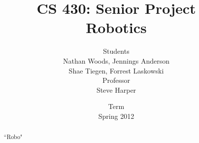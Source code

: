 \begin{titlepage}
\pagestyle{plain}
\lhead{}
\rhead{}
\title{CS 430: Senior Project\\Robotics}
\author{\small{Students}\\
Nathan Woods,  Jennings Anderson \\Shae Tiegen,  Forrest Laskowski\\[2mm]
\small{Professor}\\
Steve Harper}
\date{\small{Term}\\
Spring 2012}
\maketitle

\begin{abstract}
``Robo"

\end{abstract}
\end{titlepage}

\newpage
\setcounter{page}{1}
\pagestyle{fancyplain}
\cfoot{\small{\thepage}}
\clearpage


\pagestyle{fancyplain}
\cfoot{\small{\thepage}}
\singlespace
\tableofcontents

\clearpage
